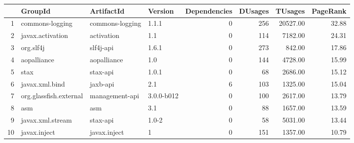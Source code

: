 \begin{table}[ht]
\centering
\begin{tabular}{rlllrrrr}
  \hline
 & GroupId & ArtifactId & Version & Dependencies & DUsages & TUsages & PageRank \\ 
  \hline
1 & commons-logging & commons-logging & 1.1.1 &   0 & 256 & 20527.00 & 32.88 \\ 
  2 & javax.activation & activation & 1.1 &   0 & 114 & 7182.00 & 24.31 \\ 
  3 & org.slf4j & slf4j-api & 1.6.1 &   0 & 273 & 842.00 & 17.86 \\ 
  4 & aopalliance & aopalliance & 1.0 &   0 & 144 & 4728.00 & 15.99 \\ 
  5 & stax & stax-api & 1.0.1 &   0 &  68 & 2686.00 & 15.12 \\ 
  6 & javax.xml.bind & jaxb-api & 2.1 &   6 & 103 & 1325.00 & 15.04 \\ 
  7 & org.glassfish.external & management-api & 3.0.0-b012 &   0 & 100 & 2617.00 & 13.79 \\ 
  8 & asm & asm & 3.1 &   0 &  88 & 1657.00 & 13.59 \\ 
  9 & javax.xml.stream & stax-api & 1.0-2 &   0 &  58 & 5031.00 & 13.44 \\ 
  10 & javax.inject & javax.inject & 1 &   0 & 151 & 1357.00 & 10.79 \\ 
   \hline
\end{tabular}
\end{table}
